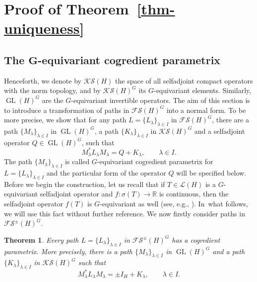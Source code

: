 \documentclass[pdftex]{sigma}
\numberwithin{equation}{section}
\newtheorem{Theorem}{Theorem}[section]
\theoremstyle{definition}
\DeclareMathOperator{\GL}{GL}
\begin{document}
\section{Proof of Theorem~\ref{thm-uniqueness}}

\subsection{The \texorpdfstring{$\boldsymbol{G}$}{G}-equivariant cogredient parametrix}
Henceforth, we denote by $\mathcal{KS}(H)$ the space of all selfadjoint compact operators with the norm topology, and by $\mathcal{KS}(H)^G$ its $G$-equivariant elements. Similarly, $\GL(H)^G$ are the $G$-equivariant invertible operators. The aim of this section is to introduce a transformation of paths in $\mathcal{FS}(H)^G$ into a normal form. To be more precise, we show that for any path $L=\{L_\lambda\}_{\lambda\in I}$ in $\mathcal{FS}(H)^G$, there are a path $\{M_\lambda\}_{\lambda\in I}$ in $\GL(H)^G$, a path $\{K_\lambda\}_{\lambda\in I}$ in $\mathcal{KS}(H)^G$ and a selfadjoint operator $Q\in\GL(H)^G$, such that
\[M^\ast_\lambda L_\lambda M_\lambda=Q+K_\lambda,\qquad\lambda\in I.\]
The path $\{M_\lambda\}_{\lambda\in I}$ is called $G$-equivariant cogredient parametrix for $L=\{L_\lambda\}_{\lambda\in I}$ and the particular form of the operator $Q$ will be specified below. Before we begin the construction, let us recall that if $T\in\mathcal{L}(H)$ is a $G$-equivariant selfadjoint operator and $f \colon \sigma(T)\rightarrow\mathbb{R}$ is continuous, then the selfadjoint operator $f(T)$ is $G$-equivariant as well (see, e.g., \cite[Lemma~3.3]{MJN21}). In~what follows, we will use this fact without further reference. We now firstly consider paths in $\mathcal{FS}^\pm(H)^G$.

\begin{Theorem}\label{thm-cogrpm}
Every path $L=\{L_\lambda\}_{\lambda\in I}$ in $\mathcal{FS}^\pm(H)^G$ has a cogredient parametrix. More precisely, there is a path $\{M_\lambda\}_{\lambda\in I}$ in $\GL(H)^G$ and a path $\{K_\lambda\}_{\lambda\in I}$ in $\mathcal{KS}(H)^G$ such that
\[M^\ast_\lambda L_\lambda M_\lambda=\pm I_H+K_\lambda,\qquad\lambda\in I.\]
\end{Theorem}
\end{document}

